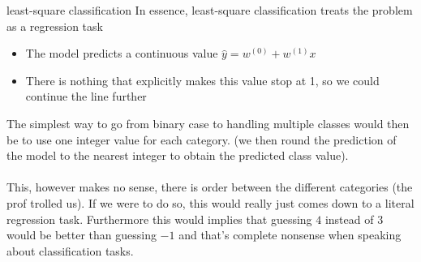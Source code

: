 \begin{parag}{least-square classification}
    In essence, least-square classification treats the problem as a regression task\\
	\begin{itemize}
		\item The model predicts a continuous value $\hat{y} = w^{\left(0\right)} + w^{\left(1\right)}x$
		\item There is nothing that explicitly makes this value stop at 1, so we could continue the line further
	\end{itemize}
	The simplest way to go from binary case to handling multiple classes would then be to use one integer value for each category. (we then round the prediction of the model to the nearest integer to obtain the predicted class value).\\
	$ $\\
	This, however makes no sense, there is  order between the different categories (the prof trolled us). If we were to do so, this would really just comes down to a literal regression task. Furthermore this would implies that guessing $4$ instead of $3$ would be better than guessing $-1$ and that's complete nonsense when speaking about classification tasks.
\end{parag}

